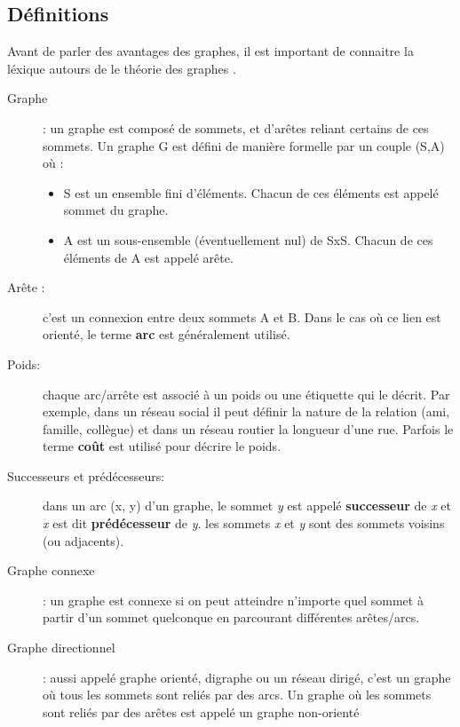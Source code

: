 \subsection{Définitions}
Avant de parler des avantages des graphes, il est important de connaitre la léxique autours de le théorie des graphes \cite{WikiGraphes}.
\begin{description}
\item[Graphe]: un graphe est composé de sommets, et d'arêtes reliant certains de ces sommets.
Un graphe G est défini de manière formelle par un couple (S,A) où :
\begin{itemize}
	\item S est un ensemble fini d'éléments. Chacun de ces éléments est appelé sommet du graphe.
	\item A est un sous-ensemble (éventuellement nul) de SxS. Chacun de ces éléments de A est appelé arête.
\end{itemize}
\item[Arête :] c'est un connexion entre deux sommets A et B. Dans le cas où ce lien est orienté, le terme \textbf{arc} est généralement utilisé.

\item[Poids:] chaque arc/arrête est associé à un poids ou une étiquette qui le décrit. Par exemple, dans un réseau social il peut définir la nature de la relation (ami, famille, collègue) et dans un réseau routier la longueur d'une rue. Parfois le terme \textbf{coût} est utilisé pour décrire le poids.

\item[Successeurs et prédécesseurs:] dans un arc (x, y) d'un graphe, le sommet \emph{y} est appelé \textbf{successeur} de \emph{x} et \emph{x} est dit \textbf{prédécesseur} de \emph{y}.\newline
les sommets \emph{x} et \emph{y} sont des sommets voisins (ou adjacents).

\item[Graphe connexe] : un graphe est connexe si on peut atteindre n'importe quel sommet à partir d'un sommet quelconque en parcourant différentes arêtes/arcs.

\item[Graphe directionnel] : aussi appelé graphe orienté, digraphe ou un réseau dirigé, c'est un graphe où tous les sommets sont reliés par des arcs.
Un graphe où les sommets sont reliés par des arêtes est appelé un graphe non-orienté


\end{description}
